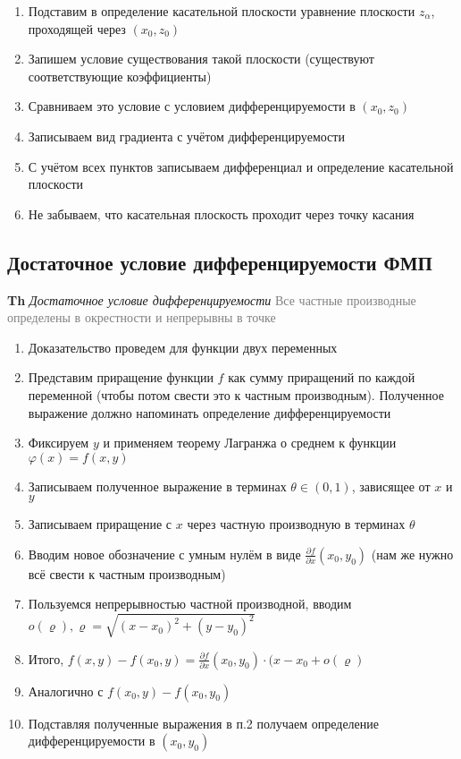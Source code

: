 \begin{enumerate}
    \item Подставим в определение касательной плоскости уравнение плоскости $z_\alpha$, проходящей через $(x_0, z_0)$
    \item Запишем условие существования такой плоскости (существуют соответствующие коэффициенты)
    \item Сравниваем это условие с условием дифференцируемости в $(x_0, z_0)$
    \item Записываем вид градиента с учётом дифференцируемости
    \item С учётом всех пунктов записываем дифференциал и определение касательной плоскости
    \item Не забываем, что касательная плоскость проходит через точку касания
\end{enumerate}

\subsection{Достаточное условие дифференцируемости ФМП}

\textbf{Th} \textit{Достаточное условие дифференцируемости}
\textcolor{gray}{Все частные производные определены в окрестности и непрерывны в точке}

\begin{enumerate}
    \item Доказательство проведем для функции двух переменных
    \item Представим приращение функции $f$ как сумму приращений по каждой переменной (чтобы потом свести это к
    частным производным).
    Полученное выражение должно напоминать определение дифференцируемости
    \item Фиксируем $y$ и применяем теорему Лагранжа о среднем к функции $\varphi (x) = f(x, y)$
    \item Записываем полученное выражение в терминах $\theta \in (0, 1)$, зависящее от $x$ и $y$
    \item Записываем приращение с $x$ через частную производную в терминах $\theta$
    \item Вводим новое обозначение с умным нулём в виде $\frac{\partial f}{\partial x} (x_0, y_0)$ (нам же нужно всё
    свести к частным производным)
    \item Пользуемся непрерывностью частной производной, вводим $o(\varrho), \varrho = \sqrt{(x - x_0)^2 + (y - y_0)^2}$
    \item Итого, $f(x, y) - f(x_0, y) =  \frac{\partial f}{\partial x} (x_0, y_0) \cdot (x - x_0 + o(\varrho)$
    \item Аналогично с $f(x_0, y) - f(x_0, y_0)$
    \item Подставляя полученные выражения в п.2 получаем определение дифференцируемости в $(x_0, y_0)$
\end{enumerate}

